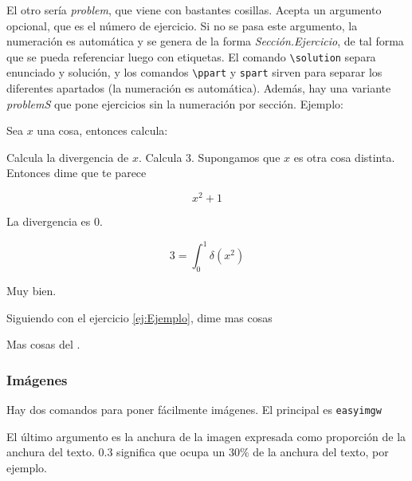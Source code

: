 El otro sería \textit{problem}, que viene con bastantes cosillas. Acepta un argumento opcional, que es el número de ejercicio. Si no se pasa este argumento, la numeración es automática y se genera de la forma \textit{Sección.Ejercicio}, de tal forma que se pueda referenciar luego con etiquetas. El comando \verb|\solution| separa enunciado y solución, y los comandos \verb|\ppart| y \verb|spart| sirven para separar los diferentes apartados (la numeración es automática). Además, hay una variante \textit{problemS} que pone ejercicios sin la numeración por sección. Ejemplo:

\begin{LTXexample}[pos=r]
\begin{problem}[3] \label{ej:Ejemplo}
Sea $x$ una cosa, entonces calcula:

\ppart Calcula la divergencia de $x$.
\ppart Calcula 3.
\ppart Supongamos que $x$ es otra cosa distinta. Entonces dime que te parece

\[ x^2 + 1 \]

\solution

\spart La divergencia es 0.

\spart

\[ 3 = \int_0^1 \delta(x^2) \]

\spart Muy bien.

\end{problem}

\begin{problemS}
Siguiendo con el ejercicio \ref{ej:Ejemplo}, dime mas cosas

\solution

\spart Mas cosas del .
\end{problemS}
\end{LTXexample}

\subsubsection{Imágenes}

Hay dos comandos para poner fácilmente imágenes. El principal es \texttt{easyimgw}

\begin{LTXexample}[pos=r]
\end{LTXexample}

El último argumento es la anchura de la imagen expresada como proporción de la anchura del texto. $0.3$ significa que ocupa un $30\%$ de la anchura del texto, por ejemplo.

